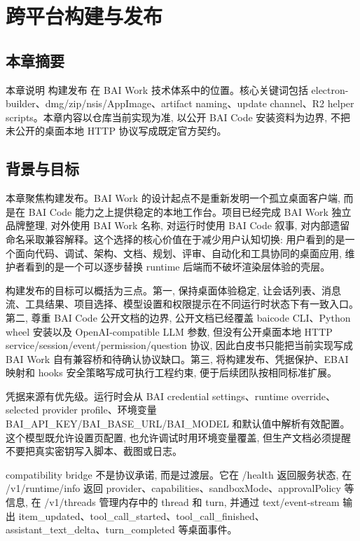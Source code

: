 \chapter{跨平台构建与发布}
\section{本章摘要}
本章说明 构建发布 在 BAI Work 技术体系中的位置。核心关键词包括 electron-builder、dmg/zip/nsis/AppImage、artifact naming、update channel、R2 helper scripts。本章内容以仓库当前实现为准, 以公开 BAI Code 安装资料为边界, 不把未公开的桌面本地 HTTP 协议写成既定官方契约。

\section{背景与目标}
本章聚焦构建发布。BAI Work 的设计起点不是重新发明一个孤立桌面客户端, 而是在 BAI Code 能力之上提供稳定的本地工作台。项目已经完成 BAI Work 独立品牌整理, 对外使用 BAI Work 名称, 对运行时使用 BAI Code 叙事, 对内部遗留命名采取兼容解释。这个选择的核心价值在于减少用户认知切换: 用户看到的是一个面向代码、调试、架构、文档、规划、评审、自动化和工具协同的桌面应用, 维护者看到的是一个可以逐步替换 runtime 后端而不破坏渲染层体验的壳层。

构建发布的目标可以概括为三点。第一, 保持桌面体验稳定, 让会话列表、消息流、工具结果、项目选择、模型设置和权限提示在不同运行时状态下有一致入口。第二, 尊重 BAI Code 公开文档的边界, 公开文档已经覆盖 baicode CLI、Python wheel 安装以及 OpenAI-compatible LLM 参数, 但没有公开桌面本地 HTTP service/session/event/permission/question 协议, 因此白皮书只能把当前实现写成 BAI Work 自有兼容桥和待确认协议缺口。第三, 将构建发布、凭据保护、EBAI 映射和 hooks 安全策略写成可执行工程约束, 便于后续团队按相同标准扩展。

凭据来源有优先级。运行时会从 BAI credential settings、runtime override、selected provider profile、环境变量 BAI\_API\_KEY/BAI\_BASE\_URL/BAI\_MODEL 和默认值中解析有效配置。这个模型既允许设置页配置, 也允许调试时用环境变量覆盖, 但生产文档必须提醒不要把真实密钥写入脚本、截图或日志。

compatibility bridge 不是协议承诺, 而是过渡层。它在 /health 返回服务状态, 在 /v1/runtime/info 返回 provider、capabilities、sandboxMode、approvalPolicy 等信息, 在 /v1/threads 管理内存中的 thread 和 turn, 并通过 text/event-stream 输出 item\_updated、tool\_call\_started、tool\_call\_finished、assistant\_text\_delta、turn\_completed 等桌面事件。

